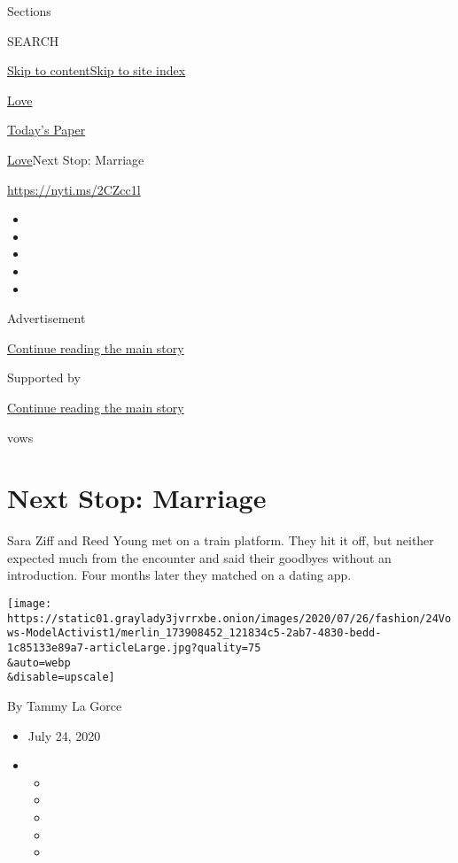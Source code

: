 Sections

SEARCH

\protect\hyperlink{site-content}{Skip to
content}\protect\hyperlink{site-index}{Skip to site index}

\href{https://www.nytimes3xbfgragh.onion/section/fashion/weddings}{Love}

\href{https://myaccount.nytimes3xbfgragh.onion/auth/login?response_type=cookie\&client_id=vi}{}

\href{https://www.nytimes3xbfgragh.onion/section/todayspaper}{Today's
Paper}

\href{/section/fashion/weddings}{Love}\textbar{}Next Stop: Marriage

\url{https://nyti.ms/2CZcc1l}

\begin{itemize}
\item
\item
\item
\item
\item
\end{itemize}

Advertisement

\protect\hyperlink{after-top}{Continue reading the main story}

Supported by

\protect\hyperlink{after-sponsor}{Continue reading the main story}

vows

\hypertarget{next-stop-marriage}{%
\section{Next Stop: Marriage}\label{next-stop-marriage}}

Sara Ziff and Reed Young met on a train platform. They hit it off, but
neither expected much from the encounter and said their goodbyes without
an introduction. Four months later they matched on a dating app.

\texttt{[image: https://static01.graylady3jvrrxbe.onion/images/2020/07/26/fashion/24Vows-ModelActivist1/merlin\_173908452\_121834c5-2ab7-4830-bedd-1c85133e89a7-articleLarge.jpg?quality=75\\\&auto=webp\\\&disable=upscale]}

By Tammy La Gorce

\begin{itemize}
\item
  July 24, 2020
\item
  \begin{itemize}
  \item
  \item
  \item
  \item
  \item
  \end{itemize}
\end{itemize}

